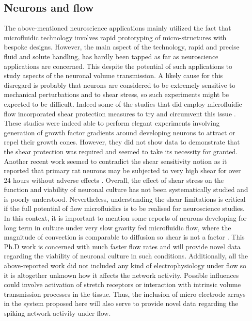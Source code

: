     \subsection{Neurons and flow}
    The above-mentioned neuroscience applications mainly utilized the fact that microfluidic technology involves rapid prototyping of micro-structures with bespoke designs. However, the main aspect of the technology, rapid and precise fluid and solute handling, has hardly been tapped as far as neuroscience applications are concerned. This despite the potential of such applications to study aspects of the neuronal volume transmission. A likely cause for this disregard is probably that neurons are considered to be extremely sensitive to mechanical perturbations and to shear stress, so such experiments might be expected to be difficult. Indeed some of the studies that did employ microfluidic flow incorporated shear protection measures to try and circumvent this issue \cite{wang2008microfluidics,morel2012amplification}. These studies were indeed able to perform elegant experiments involving generation of growth factor gradients around developing neurons to attract or repel their growth cones. However, they did not show data to demonstrate that the shear protection was required and seemed to take its necessity for granted. Another recent work seemed to contradict the shear sensitivity notion as it reported that primary rat neurons may be subjected to very high shear for over 24 hours without adverse effects \cite{liu2013galanin}. Overall, the effect of shear stress on the function and viability of neuronal culture has not been systematically studied and is poorly understood. Nevertheless, understanding the shear limitations is critical if the full potential of flow microfluidics is to be realised for neuroscience studies. In this context, it is important to mention some reports of neurons developing for long term in culture under very slow gravity fed microfluidic flow, where the magnitude of convection is comparable to diffusion so shear is not a factor \cite{choi2013neurotoxic,millet2007microfluidic,kumamoto2015effects}. This Ph.D work is concerned with much faster flow rates and will provide novel data regarding the viability of neuronal culture in such conditions. Additionally, all the above-reported work did not included any kind of electrophysiology under flow so it is altogether unknown how it affects the network activity. Possible influences could involve activation of stretch receptors or interaction with intrinsic volume transmission processes in the tissue. Thus, the inclusion of micro electrode arrays in the system proposed here will also serve to provide novel data regarding the spiking network activity under flow.
    \label{sec:introduction:neuroFlow}

